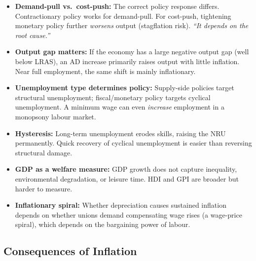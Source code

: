 \documentclass[11pt, a4paper, twoside]{book}
\begin{document}
\begin{tcolorbox}[enhanced,colback=EvalBg,colframe=EvalFrame,arc=0pt,boxrule=1pt,title={\bfseries\color{EvalFrame}Evaluation: AD, AS, Inflation and Unemployment},fonttitle=\small]
\small\RaggedRight
\begin{itemize}[itemsep=2pt,topsep=2pt]
  \item \textbf{Demand-pull vs.\ cost-push:} The correct policy response differs. Contractionary policy works for demand-pull. For cost-push, tightening monetary policy further \textit{worsens} output (stagflation risk). \textit{``It depends on the root cause.''}
  \item \textbf{Output gap matters:} If the economy has a large negative output gap (well below LRAS), an AD increase primarily raises output with little inflation. Near full employment, the same shift is mainly inflationary.
  \item \textbf{Unemployment type determines policy:} Supply-side policies target structural unemployment; fiscal/monetary policy targets cyclical unemployment. A minimum wage can even \textit{increase} employment in a monopsony labour market.
  \item \textbf{Hysteresis:} Long-term unemployment erodes skills, raising the NRU permanently. Quick recovery of cyclical unemployment is easier than reversing structural damage.
  \item \textbf{GDP as a welfare measure:} GDP growth does not capture inequality, environmental degradation, or leisure time. HDI and GPI are broader but harder to measure.
  \item \textbf{Inflationary spiral:} Whether depreciation causes sustained inflation depends on whether unions demand compensating wage rises (a wage-price spiral), which depends on the bargaining power of labour.
\end{itemize}
\end{tcolorbox}

\subsection{Consequences of Inflation}
\end{document}

